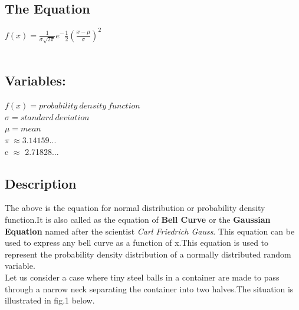 \subsection{The Equation}

{\huge $f(x)= \frac{1}{\sigma \sqrt{2\pi}} e^-\frac{1}{2}(\frac{x-\mu}{\sigma})^2$}
 \\
\\\subsection{Variables:}
$f(x) = probability \ density \ function$
 \\ $\sigma = standard \ deviation $
 \\$ \mu = mean$
 \\ $\pi \ \approx 3.14159... $
 \\ e $\approx$ 2.71828...
 \subsection{Description}
 The above is the equation for normal distribution or probability density function.It is also called as the equation of \textbf {Bell Curve} or the \textbf{Gaussian Equation} named after the scientist {\emph{Carl Friedrich Gauss}}. This equation can be used to express any bell curve as a function of x.This equation is used to represent the probability density distribution of a normally distributed random variable.
 \\Let us consider a case where tiny steel balls in a container are made to pass through a narrow neck separating the container into two halves.The situation is illustrated in fig.1 below. \\
 
